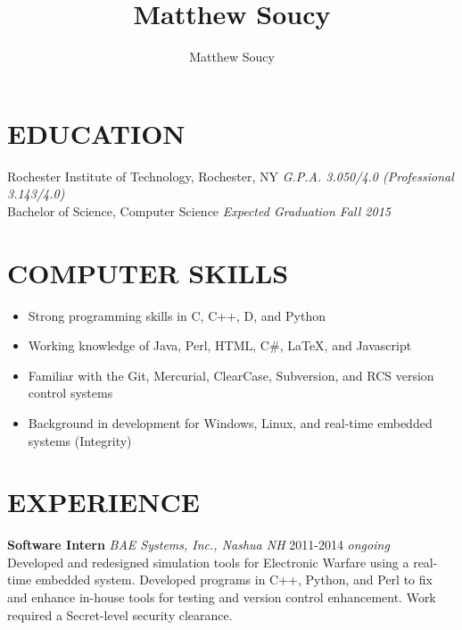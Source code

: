 \documentclass[line]{res}
\author{Matthew Soucy}
\title{Matthew Soucy}
\begin{document}
\setlength{\textheight}{11.5in} %
\address{\large
	2433 Nathaniel Rochester Hall
	\\
	Rochester, NY 14623
	\\
	(585) 204-7402
}
\address{\it
	msoucy@csh.rit.edu
	\\
	http://msoucy.me/
	\\
	http://linkedin.com/in/msoucy
}

\begin{resume}

\section{EDUCATION}

	Rochester Institute of Technology, Rochester, NY
	\hfill
	\textit{G.P.A. 3.050/4.0 (Professional 3.143/4.0)}
	\\
	Bachelor of Science, Computer Science
	\hfill
	\textit{Expected Graduation Fall 2015}

\section{COMPUTER SKILLS}

	\begin{itemize}[leftmargin=10pt]
	\item Strong programming skills in C, C++, D, and Python
	\item Working knowledge of Java, Perl, HTML, C\#, LaTeX, and Javascript
	\item Familiar with the Git, Mercurial, ClearCase, Subversion, and RCS version control systems
	\item Background in development for Windows, Linux, and real-time embedded systems (Integrity)
	\end{itemize}

\section{EXPERIENCE}

	\textbf{Software Intern}
	\textit{BAE Systems, Inc., Nashua NH}
	\hfill
	2011-2014 \textit{ongoing}\\
	Developed and redesigned simulation tools for Electronic Warfare using a real-time embedded system.
	Developed programs in C++, Python, and Perl to fix and enhance in-house tools for testing and version control enhancement.
	Work required a Secret-level security clearance.


\end{resume}
\end{document}
